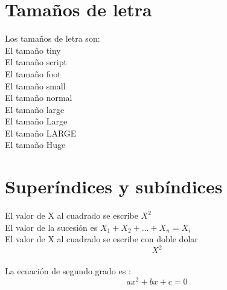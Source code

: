 \documentclass[10pt,a4paper]{book}
\begin{document}
\section{Tamaños de letra}
	Los tamaños de letra son: \\
	{\tiny El tamaño tiny} \\
	{\scripsize  El tamaño script} \\
	{\footnotesize El tamaño foot} \\
	{\small El tamaño small} \\
	{\normalsize El tamaño normal} \\
	{\large El tamaño large} \\
	{\Large El tamaño Large} \\
	{\LARGE El tamaño LARGE} \\
	{\Huge El tamaño  Huge} \\
	
\section{Superíndices y subíndices}
	El valor de X al cuadrado se escribe $ X^2 $ \\
	El valor de la sucesión es $ X_1 + X_2 + ... + X_n= X_i $ \\
	El valor de X al cuadrado se escribe con doble dolar $$ X^2 $$ \\
	La ecuación de segundo grado es : $$ ax^2 +bx +c = 0 $$ \\
\end{document}
